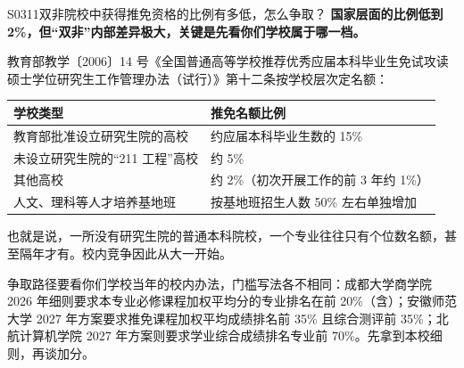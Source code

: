 \begin{qa}{S0311}{双非院校中获得推免资格的比例有多低，怎么争取？}
\textbf{国家层面的比例低到 2\%，但“双非”内部差异极大，关键是先看你们学校属于哪一档。}

教育部教学〔2006〕14 号《全国普通高等学校推荐优秀应届本科毕业生免试攻读硕士学位研究生工作管理办法（试行）》第十二条按学校层次定名额：

\par\vspace{2pt}\nobreak\begin{center}\footnotesize
\begin{tabularx}{\textwidth}{>{\raggedright\arraybackslash}X>{\raggedright\arraybackslash}X}
\toprule
\textbf{学校类型} & \textbf{推免名额比例} \\ \midrule
教育部批准设立研究生院的高校 & 约应届本科毕业生数的 15\% \\
未设立研究生院的“211 工程”高校 & 约 5\% \\
其他高校 & 约 2\%（初次开展工作的前 3 年约 1\%） \\
人文、理科等人才培养基地班 & 按基地班招生人数 50\% 左右单独增加 \\
\bottomrule
\end{tabularx}
\end{center}\vspace{2pt}\par

也就是说，一所没有研究生院的普通本科院校，一个专业往往只有个位数名额，甚至隔年才有。校内竞争因此从大一开始。

争取路径要看你们学校当年的校内办法，门槛写法各不相同：成都大学商学院 2026 年细则要求本专业必修课程加权平均分的专业排名在前 20\%（含）；安徽师范大学 2027 年方案要求推免课程加权平均成绩排名前 35\% 且综合测评前 35\%；北航计算机学院 2027 年方案则要求学业综合成绩排名专业前 70\%。先拿到本校细则，再谈加分。
\end{qa}

